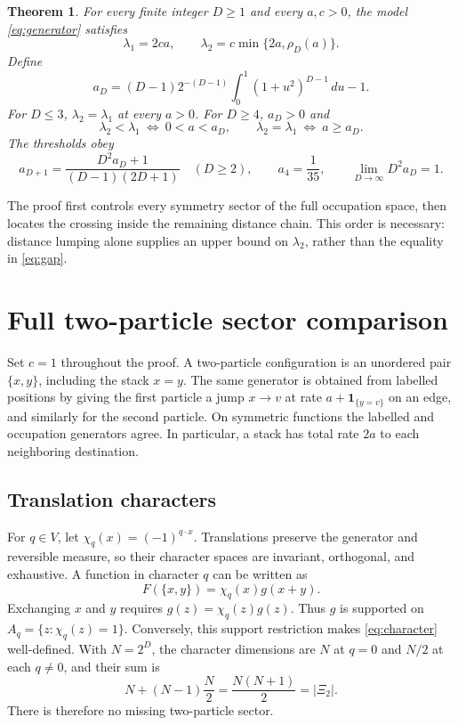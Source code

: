\documentclass[11pt,a4paper]{article}
\newtheorem{theorem}{Theorem}
\newcommand{\ind}{\mathbf{1}}
\begin{document}
\begin{theorem}\label{thm:main}
For every finite integer $D\geq1$ and every $a,c>0$, the model
\eqref{eq:generator} satisfies
\begin{equation}\label{eq:gap}
 \lambda_1=2ca,\qquad
 \lambda_2=c\min\{2a,\rho_D(a)\}.
\end{equation}
Define
\begin{equation}\label{eq:threshold}
 a_D=(D-1)2^{-(D-1)}\int_0^1(1+u^2)^{D-1}\,du-1.
\end{equation}
For $D\leq3$, $\lambda_2=\lambda_1$ at every $a>0$. For $D\geq4$,
$a_D>0$ and
\begin{equation}\label{eq:crossing}
 \lambda_2<\lambda_1\ \Longleftrightarrow\ 0<a<a_D,
 \qquad
 \lambda_2=\lambda_1\ \Longleftrightarrow\ a\geq a_D.
\end{equation}
The thresholds obey
\begin{equation}\label{eq:recurrence}
 a_{D+1}=\frac{D^2 a_D+1}{(D-1)(2D+1)}\quad(D\geq2),
 \qquad a_4=\frac1{35},\qquad \lim_{D\to\infty}D^2a_D=1.
\end{equation}
\end{theorem}

The proof first controls every symmetry sector of the full occupation
space, then locates the crossing inside the remaining distance chain.
This order is necessary: distance lumping alone supplies an upper bound
on $\lambda_2$, rather than the equality in \eqref{eq:gap}.

\section{Full two-particle sector comparison}
Set $c=1$ throughout the proof. A two-particle configuration is an unordered
pair $\{x,y\}$, including the stack $x=y$. The same generator is obtained
from labelled positions by giving the first particle a jump $x\to v$ at
rate $a+\ind_{\{y=v\}}$ on an edge, and similarly for the second particle.
On symmetric functions the labelled and occupation generators agree.
In particular, a stack has total rate $2a$ to each neighboring destination.

\subsection{Translation characters}
For $q\in V$, let $\chi_q(x)=(-1)^{q\cdot x}$. Translations preserve the
generator and reversible measure, so their character spaces are invariant,
orthogonal, and exhaustive. A function in character $q$ can be written as
\begin{equation}\label{eq:character}
 F(\{x,y\})=\chi_q(x)g(x+y).
\end{equation}
Exchanging $x$ and $y$ requires
$g(z)=\chi_q(z)g(z)$. Thus $g$ is supported on
$A_q=\{z:\chi_q(z)=1\}$. Conversely, this support restriction makes
\eqref{eq:character} well-defined. With $N=2^D$, the character dimensions
are $N$ at $q=0$ and $N/2$ at each $q\ne0$, and their sum is
\begin{equation}
 N+(N-1)\frac N2=\frac{N(N+1)}2=|\Xi_2|.
\end{equation}
There is therefore no missing two-particle sector.
\end{document}
